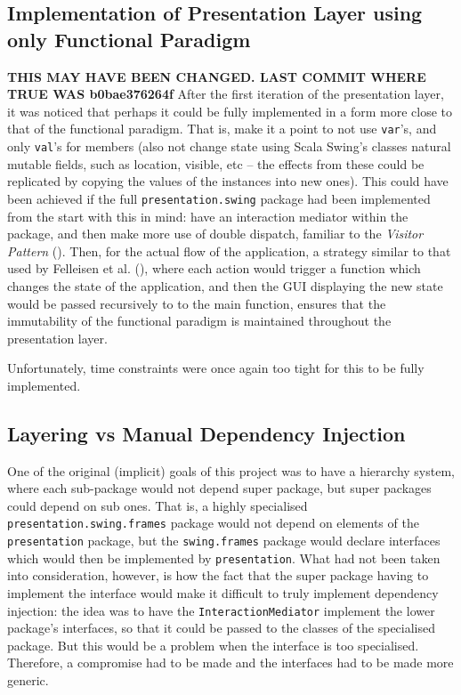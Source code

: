\subsection{Implementation of Presentation Layer using only Functional Paradigm}
\textbf{THIS MAY HAVE BEEN CHANGED. LAST COMMIT WHERE TRUE WAS b0bae376264f}
After the first iteration of the presentation layer, it was noticed that
perhaps it could be fully implemented in a form more close to that of the
functional paradigm. That is, make it a point to not use \texttt{var}'s, and
only \texttt{val}'s for members (also not change state using Scala Swing's
classes natural mutable fields, such as location, visible, etc -- the effects
from these could be replicated by copying the values of the instances into new
ones). This could have been achieved if the full \texttt{presentation.swing}
package had been implemented from the start with this in mind: have an
interaction mediator within the package, and then make more use of double
dispatch, familiar to the \emph{Visitor Pattern}
(\cite[][Ch.~8,~Location~3943]{nikolov2016scala}). Then, for the actual flow of
the application, a strategy similar to that used by Felleisen et al.
(\citeyear[][Ch.~5]{felleisen2013realm}), where each action would trigger a
function which changes the state of the application, and then the GUI
displaying the new state would be passed recursively to to the main function,
ensures that the immutability of the functional paradigm is maintained
throughout the presentation layer.

Unfortunately, time constraints were once again too tight for this to be fully
implemented.

\subsection{Layering vs Manual Dependency Injection}
One of the original (implicit) goals of this project was to have a hierarchy
system, where each sub-package would not depend super package, but super
packages could depend on sub ones. That is, a highly specialised
\texttt{presentation.swing.frames} package would not depend on elements of the
\texttt{presentation} package, but the \texttt{swing.frames} package would
declare interfaces which would then be implemented by \texttt{presentation}.
What had not been taken into consideration, however, is how the fact that the
super package having to implement the interface would make it difficult to
truly implement dependency injection: the idea was to have the
\texttt{InteractionMediator} implement the lower package's interfaces, so that
it could be passed to the classes of the specialised package. But this would be
a problem when the interface is too specialised. Therefore, a compromise had to
be made and the interfaces had to be made more generic.

